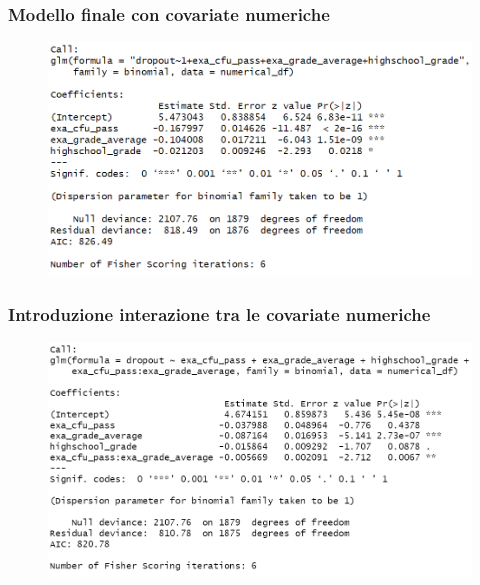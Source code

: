 \documentclass{beamer}
\begin{document}
\begin{frame}
\frametitle{Modello finale con covariate numeriche}
\begin{figure}[h]
    \centering
    \includegraphics[width=1.07\textwidth]{Screenshot 2024-05-26 120822.png} %
    \label{}
\end{figure}
\end{frame}


\begin{frame}
\frametitle{Introduzione interazione tra le covariate numeriche}
\begin{figure}[h]
    \centering
    \includegraphics[width=1.07\textwidth]{Screenshot 2024-05-26 121019.png} %
    \label{}
\end{figure}

\end{frame}
\end{document}

